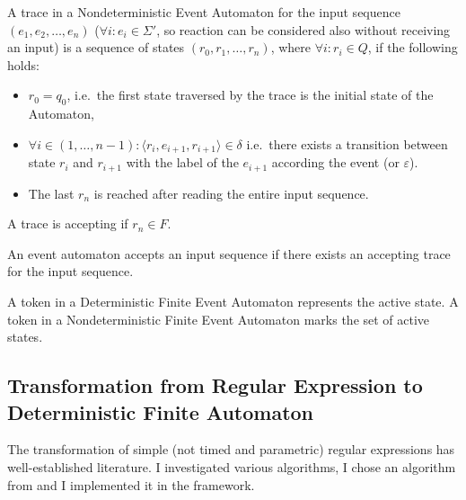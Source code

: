 		\begin{dfn}
			\label{dfn:cep:nea:trace}
			A trace in a Nondeterministic Event Automaton for the input sequence $(e_1, e_2, \dots, e_n)$ ($\forall i: e_i \in \Sigma'$, so reaction can be considered also without receiving an input) is
			a sequence of states $(r_0, r_1, \dots, r_n)$, where $\forall i: r_i \in Q$, if the following holds:
			\begin{itemize}
				\item$r_0 = q_0$, i.e.~the first state traversed by the trace is the initial state of the Automaton,
				\item $\forall i \in (1,\dots,n-1): \langle r_i, e_{i+1}, r_{i+1} \rangle \in \delta$ i.e.~there exists a transition between state $r_i$ and $r_{i+1}$ with the label of the $e_{i+1}$ according the event (or $\varepsilon$).	
				\item The last $r_n$ is reached after reading the entire input sequence.	
			\end{itemize}
			A trace is accepting if $r_n \in F$.
		\end{dfn}
			
		\begin{dfn}
			\label{dfn:cep:nea:accepting}
			An event automaton accepts an input sequence if there exists an accepting trace for the input sequence.
		\end{dfn}
		
		\begin{dfn}
			\label{dfn:cep:nea:token}
			A token in a Deterministic Finite Event Automaton represents the active state. A token in a Nondeterministic Finite Event Automaton marks the set of active states.
		\end{dfn}
		
		\subsection{Transformation from Regular Expression to Deterministic Finite Automaton}
			The transformation of simple (not timed and parametric) regular expressions has well-established literature. I investigated various algorithms, I chose an algorithm from \citep{lam2006compilers} and I implemented it in the framework.
	
			
